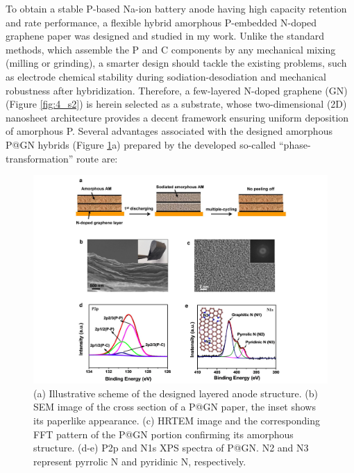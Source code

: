To obtain a stable P-based Na-ion battery anode having high capacity retention and rate performance, a flexible hybrid amorphous P-embedded N-doped graphene paper was designed and studied in my work. Unlike the standard methods, which assemble the P and C components by any mechanical mixing (milling or grinding), a smarter design should tackle the existing problems, such as electrode chemical stability during sodiation-desodiation and mechanical robustness after hybridization. Therefore, a few-layered N-doped graphene (GN) (Figure \ref{fig:4_s2}) is herein selected as a substrate, whose two-dimensional (2D) nanosheet architecture provides a decent framework ensuring uniform deposition of amorphous P.\cite{Nicolosi2013b,Huang2015b} Several advantages associated with the designed amorphous P@GN hybrids (Figure \ref{fig:4_1}a) prepared by the developed so-called “phase-transformation” route are:\\

\begin{figure} [ht]
\centering
\includegraphics[height=0.8\textwidth, angle=-90]{figures/figure4_1}
\caption[Design and characterizations of P@GN]
{(a) Illustrative scheme of the designed layered anode structure. (b) SEM image of the cross section of a P@GN paper, the inset shows its paperlike appearance. (c) HRTEM image and the corresponding FFT pattern of the P@GN portion confirming its amorphous structure. (d-e) P2p and N1s XPS spectra of P@GN. N2 and N3 represent pyrrolic N and pyridinic N, respectively. 
\label{fig:4_1}}
\end{figure}


